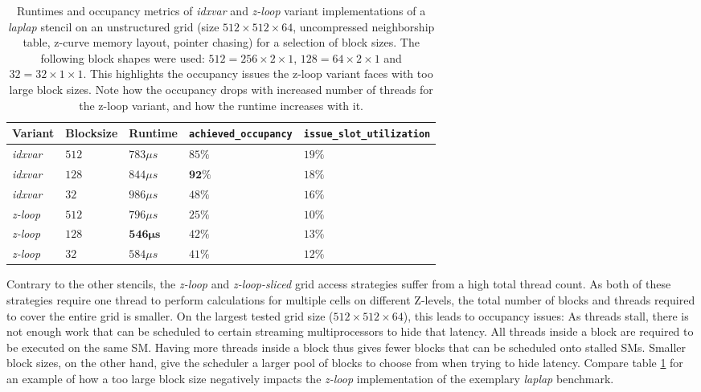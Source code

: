\begin{table}
    \begin{tabular}{l l l p{2.5cm} p{2.5cm}}
        \hline
        \textbf{Variant} & \textbf{Blocksize} & \textbf{Runtime} & \textbf{\texttt{achieved\_\allowbreak occupancy}} & \textbf{\texttt{issue\_\allowbreak slot\_\allowbreak utilization}} \\
        \hline
        \hline
        \emph{idxvar} & $512$ & $783\mu s$ & $85\%$ & $19\%$ \\
        \emph{idxvar} & $128$ & $844\mu s$ & $\mathbf{92\%}$ & $18\%$ \\
        \emph{idxvar} & $32$  & $986\mu s$ & $48\%$ & $16\%$ \\
        \emph{z-loop} & $512$ & $796\mu s$ & $25\%$ & $10\%$\\
        \emph{z-loop} & $128$ & $\mathbf{546\mu s}$ & $42\%$ & $13\%$ \\ 
        \emph{z-loop} & $32$  & $584\mu s$ & $41\%$ & $12\%$ \\
        \hline
    \end{tabular}
    \caption{\label{tab:laplap-blocksize-occupancy} Runtimes and occupancy metrics of \emph{idxvar} and \emph{z-loop} variant implementations of a \emph{laplap} stencil on an unstructured grid (size $512\times 512\times 64$, uncompressed neighborship table, z-curve memory layout, pointer chasing) for a selection of block sizes. The following block shapes were used: $512 = 256\times 2\times 1$, $128 = 64\times 2\times 1$ and $32 = 32\times 1 \times 1$. This highlights the occupancy issues the z-loop variant faces with too large block sizes. Note how the occupancy drops with increased number of threads for the z-loop variant, and how the runtime increases with it.}
\end{table}

Contrary to the other stencils, the \emph{z-loop} and \emph{z-loop-sliced} grid access strategies suffer from a high total thread count. As both of these strategies require one thread to perform calculations for multiple cells on different Z-levels, the total number of blocks and threads required to cover the entire grid is smaller. On the largest tested grid size ($512\times 512\times 64$), this leads to occupancy issues: As threads stall, there is not enough work that can be scheduled to certain streaming multiprocessors to hide that latency. All threads inside a block are required to be executed on the same SM. Having more threads inside a block thus gives fewer blocks that can be scheduled onto stalled SMs. Smaller block sizes, on the other hand, give the scheduler a larger pool of blocks to choose from when trying to hide latency. Compare table \ref{tab:laplap-blocksize-occupancy} for an example of how a too large block size negatively impacts the \emph{z-loop} implementation of the exemplary \emph{laplap} benchmark.